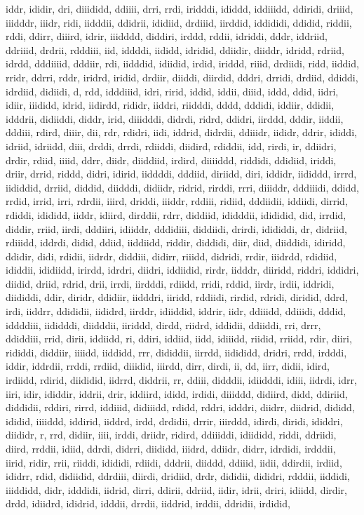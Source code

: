 \documentclass{article}
\begin{document}
iddr, ididir, dri, diiididd, ddiiii, drri, rrdi, iridddi, ididdd, iddiiidd, ddiridi, driiid, iiidddr, iiidr, ridi, iidddii, ddidrii, ididiid, drdiiid, iirddid, iddididi, ddidid, riddii, rddi, ddirr, diiird, idrir, iiidddd, diddiri, irddd, rddii, idriddi, dddr, iddriid, ddriiid, drdrii, rdddiii, iid, iddddi, iididd, idridid, ddiidir, diiddr, idridd, rdriid, idrdd, dddiiiid, dddiir, rdi, iidddid, idiidid, irdid, iriddd, riiid, drdiidi, ridd, iiddid, rridr, ddrri, rddr, iridrd, iridid, drdiir, diiddi, diirdid, dddri, drridi, drdiid, ddiddi, idrdiid, didiidi, d, rdd, idddiiid, idri, ririd, iddid, iddii, diiid, iddd, ddid, iidri, idiir, iiididd, idrid, iidirdd, rididr, iiddri, riidddi, dddd, dddidi, iddiir, ddidii, idddrii, didiiddi, diddr, irid, diiidddi, didrdi, ridrd, ddidri, iirddd, dddir, iiddii, dddiii, rdird, diiir, dii, rdr, rdidri, iidi, iddrid, didrdii, ddiiidr, iididr, ddrir, ididdi, idriid, idriidd, diii, drddi, drrdi, rdiiddi, diidird, rdiddii, idd, rirdi, ir, ddiidri, drdir, rdiid, iiiid, ddrr, diidr, diiddiid, irdird, diiiiddd, riddidi, ddidiid, iriddi, driir, drrid, riddd, didri, idirid, iiddddi, dddiid, diriidd, diri, iddidr, iididdd, irrrd, iididdid, drriid, diddid, diidddi, didiidr, ridrid, rirddi, rrri, diiiddr, dddiiidi, ddidd, rrdid, irrid, irri, rdrdii, iiird, driddi, iiiddr, rddiii, ridiid, dddiidii, iddiidi, dirrid, rdiddi, idididd, iiddr, idiird, dirddii, rdrr, diddiid, ididddii, idididid, did, irrdid, diddir, rriid, iirdi, dddiiri, idiiddr, dddidiii, diddiidi, drirdi, idididdi, dr, didriid, rdiiidd, iddrdi, didid, ddiid, iiddiidd, riddir, diddidi, diir, diid, diiddidi, idiridd, ddidir, didi, rdidii, iidrdr, diddiii, didirr, riiidd, didridi, rrdir, iiidrdd, rdidiid, ididdii, ididiidd, irirdd, idrdri, diidri, iddiidid, rirdr, iidddr, diiridd, riddri, iddidri, diidid, driid, rdrid, drii, irrdi, iirdddi, rdiidd, rridi, rddid, iirdr, irdii, iddridi, diididdi, ddir, diridr, ddidiir, iidddri, iiridd, rddiidi, rirdid, rdridi, diridid, ddrd, irdi, iiddrr, ddididii, iididrd, iirddr, idiiddid, iddrir, iidr, ddiiidd, ddiiidi, dddid, iddddiii, iididddi, diidddii, iiriddd, dirdd, riidrd, iddidii, ddiiddi, rri, drrr, ddiddiii, rrid, dirii, iddiidd, ri, ddiri, iddiid, iidd, idiiidd, riidid, rriidd, rdir, diiri, rididdi, diddiir, iiiidd, iiddidd, rrr, dididdii, iirrdd, iidididd, dridri, rrdd, irdddi, iddir, iddrdii, rrddi, rrdiid, diiidid, iiirdd, dirr, dirdi, ii, dd, iirr, didii, idird, irdiidd, rdirid, diididid, iidrrd, diddrii, rr, ddiii, didddii, idiidddi, idiii, iidrdi, idrr, iiri, idir, ididdir, iddrii, drir, iddiird, ididd, irdidi, diiiddd, didiird, didd, ddiriid, diddidii, rddiri, rirrd, iddiiid, didiiidd, rdidd, rddri, idddri, diidrr, diidrid, dididd, ididid, iiiiddd, iddirid, iiddrd, irdd, drdidii, drrir, iiirddd, idirdi, diridi, ididdri, diididr, r, rrd, didiir, iiii, irddi, driidr, ridird, ddiiiddi, idiididd, riddi, ddriidi, diird, rrddii, idiid, ddrdi, didrri, diididd, iiidrd, ddiidr, didrr, idrdidi, irdddii, iirid, ridir, rrii, riiddi, idididi, rdiidi, dddrii, diiddd, ddiiid, iidii, ddirdii, irdiid, ididrr, rdid, didiidid, ddrdiii, diirdi, dridiid, drdr, dididii, dididri, rdddii, iiddidi, iiiddidd, didr, idddidi, iidrid, dirri, ddirii, ddriid, iidir, idrii, driri, idiidd, dirdir, drdd, idiidrd, ididrid, idddii, drrdii, iiddrid, irddii, ddridii, irdidid, 
\end{document}
